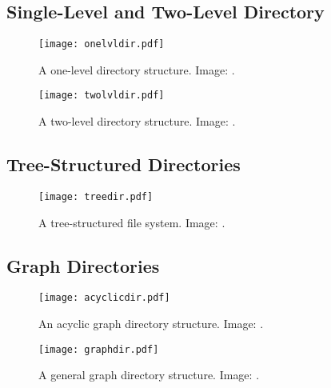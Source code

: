 \documentclass{beamer}
\begin{document}
\subsection{Single-Level and Two-Level Directory}

\begin{frame}{\insertsubsectionhead}
  \begin{figure}
    \texttt{[image: onelvldir.pdf]}
    \caption{A one-level directory structure.
      Image: \cite{Silberschatz2013osc}.}
  \end{figure}
\end{frame}

\begin{frame}{\insertsubsectionhead}
  \begin{figure}
    \texttt{[image: twolvldir.pdf]}
    \caption{A two-level directory structure.
      Image: \cite{Silberschatz2013osc}.}
  \end{figure}
\end{frame}

\subsection{Tree-Structured Directories}

\begin{frame}{\insertsubsectionhead}
  \begin{figure}
    \texttt{[image: treedir.pdf]}
    \caption{A tree-structured file system.
      Image: \cite{Silberschatz2013osc}.}
  \end{figure}
\end{frame}

\subsection{Graph Directories}

\begin{frame}{\insertsubsectionhead}
  \begin{figure}
    \texttt{[image: acyclicdir.pdf]}
    \caption{An acyclic graph directory structure.
      Image: \cite{Silberschatz2013osc}.}
  \end{figure}
\end{frame}

\begin{frame}{\insertsubsectionhead}
  \begin{figure}
    \texttt{[image: graphdir.pdf]}
    \caption{A general graph directory structure.
      Image: \cite{Silberschatz2013osc}.}
  \end{figure}
\end{frame}
\end{document}
